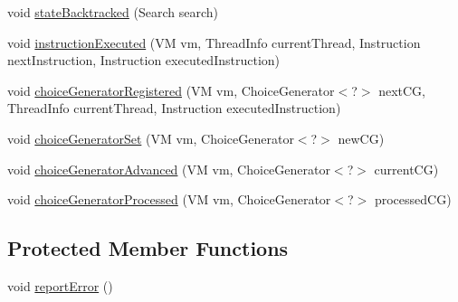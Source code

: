 \begin{DoxyCompactItemize}
\item 
void \hyperlink{classgov_1_1nasa_1_1jpf_1_1inspector_1_1server_1_1jpf_1_1_inspector_listener_mode_silent_ade1aba0d38921a0be32016c4c787513d}{state\+Backtracked} (Search search)
\item 
void \hyperlink{classgov_1_1nasa_1_1jpf_1_1inspector_1_1server_1_1jpf_1_1_inspector_listener_mode_silent_acbaea0c61c0233a2a1f3b89eb2b67300}{instruction\+Executed} (VM vm, Thread\+Info current\+Thread, Instruction next\+Instruction, Instruction executed\+Instruction)
\item 
void \hyperlink{classgov_1_1nasa_1_1jpf_1_1inspector_1_1server_1_1jpf_1_1_inspector_listener_mode_silent_a3714263e246af7c965e2fae18e66d49d}{choice\+Generator\+Registered} (VM vm, Choice\+Generator$<$?$>$ next\+CG, Thread\+Info current\+Thread, Instruction executed\+Instruction)
\item 
void \hyperlink{classgov_1_1nasa_1_1jpf_1_1inspector_1_1server_1_1jpf_1_1_inspector_listener_mode_silent_a3abeb77507b08efe94a8bbe126cdd9ab}{choice\+Generator\+Set} (VM vm, Choice\+Generator$<$?$>$ new\+CG)
\item 
void \hyperlink{classgov_1_1nasa_1_1jpf_1_1inspector_1_1server_1_1jpf_1_1_inspector_listener_mode_silent_a8f5eec9ddf69c9bdeb0240bee724e09a}{choice\+Generator\+Advanced} (VM vm, Choice\+Generator$<$?$>$ current\+CG)
\item 
void \hyperlink{classgov_1_1nasa_1_1jpf_1_1inspector_1_1server_1_1jpf_1_1_inspector_listener_mode_silent_ae24707fa40fc40836bea013869bb599a}{choice\+Generator\+Processed} (VM vm, Choice\+Generator$<$?$>$ processed\+CG)
\end{DoxyCompactItemize}
\subsection*{Protected Member Functions}
\begin{DoxyCompactItemize}
\item 
void \hyperlink{classgov_1_1nasa_1_1jpf_1_1inspector_1_1server_1_1jpf_1_1_inspector_listener_mode_silent_a8235a8c942226db3fbea54c1ad253468}{report\+Error} ()
\end{DoxyCompactItemize}
